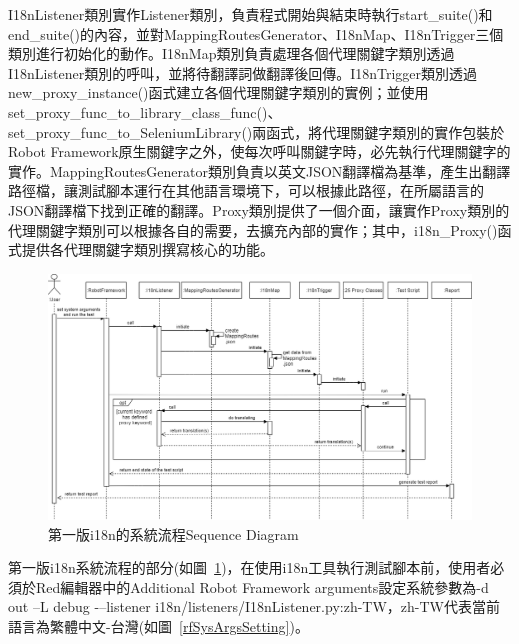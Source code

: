 I18nListener類別實作Listener類別，負責程式開始與結束時執行start\_suite()和end\_suite()的內容，並對MappingRoutesGenerator、I18nMap、I18nTrigger三個類別進行初始化的動作。I18nMap類別負責處理各個代理關鍵字類別透過I18nListener類別的呼叫，並將待翻譯詞做翻譯後回傳。I18nTrigger類別透過new\_proxy\_instance()函式建立各個代理關鍵字類別的實例；並使用set\_proxy\_func\_to\_library\_class\_func()、set\_proxy\_func\_to\_SeleniumLibrary()兩函式，將代理關鍵字類別的實作包裝於Robot Framework原生關鍵字之外，使每次呼叫關鍵字時，必先執行代理關鍵字的實作。MappingRoutesGenerator類別負責以英文JSON翻譯檔為基準，產生出翻譯路徑檔，讓測試腳本運行在其他語言環境下，可以根據此路徑，在所屬語言的JSON翻譯檔下找到正確的翻譯。Proxy類別提供了一個介面，讓實作Proxy類別的代理關鍵字類別可以根據各自的需要，去擴充內部的實作；其中，i18n\_Proxy()函式提供各代理關鍵字類別撰寫核心的功能。

\begin{figure}[H]
    \includegraphics[width= 1.1\textwidth]{../UML/i18n sequence diagram-第一版i18n系統流程.png}
    \caption{第一版i18n的系統流程Sequence Diagram}
    \label{1stI18nSequenceDiagram}
\end{figure}
第一版i18n系統流程的部分(如圖~\ref{1stI18nSequenceDiagram})，在使用i18n工具執行測試腳本前，使用者必須於Red編輯器\cite{red}中的Additional Robot Framework arguments設定系統參數為-d out –L debug -–listener i18n/listeners/I18nListener.py:zh-TW，zh-TW代表當前語言為繁體中文-台灣(如圖~\ref{rfSysArgsSetting})。

